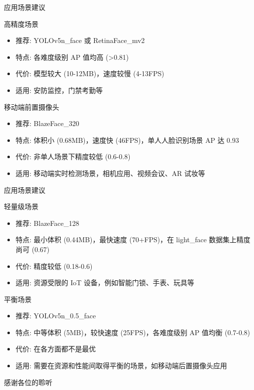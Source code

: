 \documentclass{beamer}
\begin{document}
\begin{frame}{应用场景建议}
    \begin{block}{高精度场景}
        \begin{itemize}
            \footnotesize
            \item 推荐: YOLOv5n\_face 或 RetinaFace\_mv2
            \item 特点: 各难度级别 AP 值均高 (>0.81)
            \item 代价: 模型较大 (10-12MB)，速度较慢 (4-13FPS)
            \item 适用: 安防监控，门禁考勤等
        \end{itemize}
    \end{block}

    \begin{block}{移动端前置摄像头}
        \begin{itemize}
            \footnotesize
            \item 推荐: BlazeFace\_320
            \item 特点: 体积小 (0.68MB)，速度快 (46FPS)，单人人脸识别场景 AP 达 0.93
            \item 代价: 非单人场景下精度较低 (0.6-0.8)
            \item 适用: 移动端实时检测场景，相机应用、视频会议、AR 试妆等
        \end{itemize}
    \end{block}
\end{frame}


\begin{frame}{应用场景建议}
    \begin{block}{轻量级场景}
        \begin{itemize}
            \footnotesize
            \item 推荐: BlazeFace\_128
            \item 特点: 最小体积 (0.44MB)，最快速度 (70+FPS)，在 light\_face 数据集上精度尚可 (0.67)
            \item 代价: 精度较低 (0.18-0.6)
            \item 适用: 资源受限的 IoT 设备，例如智能门锁、手表、玩具等
        \end{itemize}
    \end{block}
    \begin{block}{平衡场景}
        \begin{itemize}
            \footnotesize
            \item 推荐: YOLOv5n\_0.5\_face
            \item 特点: 中等体积 (5MB)，较快速度 (25FPS)，各难度级别 AP 值均衡 (0.7-0.8)
            \item 代价: 在各方面都不是最优
            \item 适用: 需要在资源和性能间取得平衡的场景，如移动端后置摄像头应用
        \end{itemize}
    \end{block}
\end{frame}

\begin{frame}
    \begin{center}
        {\Huge\calligra 感谢各位的聆听}
    \end{center}
\end{frame}
\end{document}
